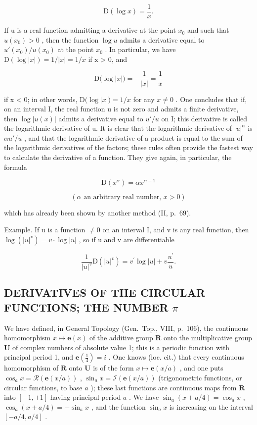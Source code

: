 \[
\mathrm{D} (\log x) = \frac {1}{x}.\tag{10}
\]

If u is a real function admitting a derivative at the point \(x_{0}\) and such that \(u(x_{0}) > 0\) , then the function \(\log u\) admits a derivative equal to \(u'(x_{0})/u(x_{0})\) at the point \(x_{0}\) . In particular, we have \(\mathrm{D}\left(\log |x|\right) = 1/|x| = 1/x\) if x \textgreater{} 0, and

\[
\mathrm{D} \big (\log | x | \big) = - \frac {1}{| x |} = \frac {1}{x}
\]

if x \textless{} 0; in other words, \(\mathrm{D}\big(\log|x|\big) = 1/x\) for any \(x \neq 0\) . One concludes that if, on an interval I, the real function u is not zero and admits a finite derivative, then \(\log|u(x)|\) admits a derivative equal to \(u'/u\) on I; this derivative is called the logarithmic derivative of u. It is clear that the logarithmic derivative of \(|u|^{\alpha}\) is \(\alpha u'/u\) , and that the logarithmic derivative of a product is equal to the sum of the logarithmic derivatives of the factors; these rules often provide the fastest way to calculate the derivative of a function. They give again, in particular, the formula

\[
\mathrm{D} \left(x ^ {\alpha}\right) = \alpha x ^ {\alpha - 1}
\]

\[
(\alpha \text {   an   arbitrary   real   number,   } x > 0)\tag{11}
\]

which has already been shown by another method (II, p.~69).

Example. If u is a function \(\neq 0\) on an interval I, and v is any real function, then \(\log(|u|^{v}) = v \cdot \log |u|\) , so if u and v are differentiable

\[
\frac {1}{| u | ^ {v}} \mathrm{D} (| u | ^ {v}) = v ^ {\prime} \log | u | + v \frac {u ^ {\prime}}{u}.
\]

\subsection{\texorpdfstring{DERIVATIVES OF THE CIRCULAR FUNCTIONS; THE NUMBER \(\pi\)}{DERIVATIVES OF THE CIRCULAR FUNCTIONS; THE NUMBER PI}}

We have defined, in General Topology (Gen.~Top., VIII, p.~106), the continuous homomorphism \(x \mapsto \mathbf{e}(x)\) of the additive group \(\mathbf{R}\) onto the multiplicative group \(\mathbf{U}\) of complex numbers of absolute value 1; this is a periodic function with principal period 1, and \(\mathbf{e}\left(\frac{1}{4}\right) = i\) . One knows (loc. cit.) that every continuous homomorphism of \(\mathbf{R}\) onto \(\mathbf{U}\) is of the form \(x \mapsto \mathbf{e}(x / a)\) , and one puts \(\cos_a x = \mathcal{R}(\mathbf{e}(x / a))\) , \(\sin_a x = \mathcal{I}(\mathbf{e}(x / a))\) (trigonometric functions, or circular functions, to base \(a\) ); these last functions are continuous maps from \(\mathbf{R}\) into \([-1, +1]\) having principal period \(a\) . We have \(\sin_a(x + a / 4) = \cos_a x\) , \(\cos_a(x + a / 4) = -\sin_a x\) , and the function \(\sin_a x\) is increasing on the interval \([-a / 4, a / 4]\) .

